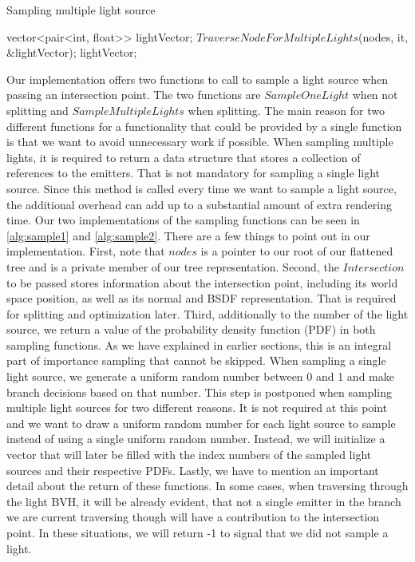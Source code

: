 	\begin{algorithm}
		\caption{Sampling multiple light source}
		\label{alg:sample2}
		\begin{algorithmic}[1] %
				\State vector<pair<int, float>> lightVector;
				\State $TraverseNodeForMultipleLights$(nodes, it, \&lightVector);
				\State \Return lightVector;
				\EndProcedure
			\end{algorithmic}
		\end{algorithm}

Our implementation offers two functions to call to sample a light source when passing an intersection point. The two functions are $SampleOneLight$ when not splitting and $SampleMultipleLights$ when splitting. The main reason for two different functions for a functionality that could be provided by a single function is that we want to avoid unnecessary work if possible. When sampling multiple lights, it is required to return a data structure that stores a collection of references to the emitters. That is not mandatory for sampling a single light source. Since this method is called every time we want to sample a light source, the additional overhead can add up to a substantial amount of extra rendering time. Our two implementations of the sampling functions can be seen in \ref{alg:sample1} and \ref{alg:sample2}. There are a few things to point out in our implementation. First, note that $nodes$ is a pointer to our root of our flattened tree and is a private member of our tree representation. Second, the $Intersection$ to be passed stores information about the intersection point, including its world space position, as well as its normal and BSDF representation. That is required for splitting and optimization later. Third, additionally to the number of the light source, we return a value of the probability density function (PDF) in both sampling functions. As we have explained in earlier sections, this is an integral part of importance sampling that cannot be skipped. When sampling a single light source, we generate a uniform random number between 0 and 1 and make branch decisions based on that number. This step is postponed when sampling multiple light sources for two different reasons. It is not required at this point and we want to draw a uniform random number for each light source to sample instead of using a single uniform random number. Instead, we will initialize a vector that will later be filled with the index numbers of the sampled light sources and their respective PDFs. Lastly, we have to mention an important detail about the return of these functions. In some cases, when traversing through the light BVH, it will be already evident, that not a single emitter in the branch we are current traversing though will have a contribution to the intersection point. In these situations, we will return -1 to signal that we did not sample a light.

